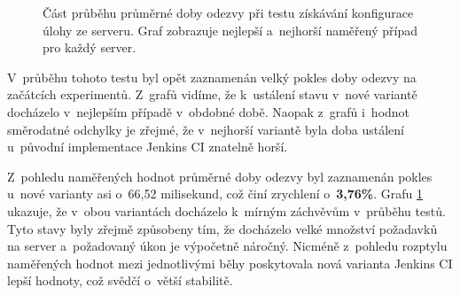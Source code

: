             \begin{figure}[h!t]
             \begin{adjustwidth}{-0.5cm}{}
                \begin{center}
                    \caption{Část průběhu průměrné doby odezvy při testu získávání konfigurace úlohy ze serveru.
                        Graf zobrazuje nejlepší a~nejhorší naměřený případ pro každý server.}
                    \label{imgGetFreestyleCast}
                \end{center}
             \end{adjustwidth}
            \end{figure}

            V~průběhu tohoto testu byl opět zaznamenán velký pokles doby odezvy na začátcích experimentů.
            Z~grafů vidíme, že k~ustálení stavu v~nové variantě docházelo v~nejlepším případě v~obdobné době.
            Naopak z~grafů i~hodnot směrodatné odchylky je zřejmé,
            že v~nejhorší variantě byla doba ustálení u~původní implementace Jenkins CI znatelně horší.

            Z~pohledu naměřených hodnot průměrné doby odezvy byl zaznamenán pokles
            u~nové varianty asi o~66,52 milisekund, což činí zrychlení o~\textbf{3,76\%}.
            Grafu \ref{imgGetFreestyleCast} ukazuje, že v~obou variantách 
            docházelo k~mírným záchvěvům v~průběhu testů. Tyto stavy byly zřejmě 
            způsobeny tím, že docházelo velké množství požadavků na server
            a~požadovaný úkon je výpočetně náročný. 
            Nicméně z~pohledu rozptylu naměřených hodnot mezi jednotlivými
            běhy poskytovala nová varianta Jenkins CI lepší hodnoty,
            což svědčí o~větší stabilitě.



